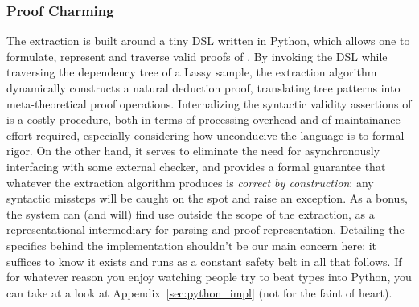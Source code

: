\subsubsection{Proof Charming}
The extraction is built around a tiny DSL written in Python, which allows one to formulate, represent and traverse valid proofs of \NLPplus.
By invoking the DSL while traversing the dependency tree of a Lassy sample, the extraction algorithm dynamically constructs a natural deduction proof, translating tree patterns into meta-theoretical proof operations.
Internalizing the syntactic validity assertions of \NLPplus{} is a costly procedure, both in terms of processing overhead and of maintainance effort required, especially considering how unconducive the language is to formal rigor.
On the other hand, it serves to eliminate the need for asynchronously interfacing with some external checker, and provides a formal guarantee that whatever the extraction algorithm produces is \textit{correct by construction}: any syntactic missteps will be caught on the spot and raise an exception.
As a bonus, the system can (and will) find use outside the scope of the extraction, as a representational intermediary for parsing and proof representation.
Detailing the specifics behind the implementation shouldn't be our main concern here; it suffices to know it exists and runs as a constant safety belt in all that follows.
If for whatever reason you enjoy watching people try to beat types into Python, you can take at a look at Appendix~\ref{sec:python_impl} (not for the faint of heart).

